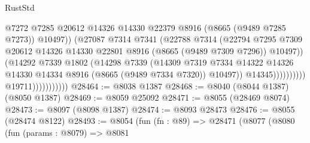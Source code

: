 \begin{lexlean}{RustStd}
\begin{coremodule}
                                              @7272
                                              @7285
                                              @20612
                                              @14326
                                              @14330
                                              @22379
                                              @8916
                                              (@8665 (@9489 @7285 @7273))
                                              @10497))
                                          (@27087
                                            @7314
                                            @7341
                                            (@22788
                                              @7314
                                              (@22794
                                                @7295
                                                @7309
                                                @20612
                                                @14326
                                                @14330
                                                @22801
                                                @8916
                                                (@8665 (@9489 @7309 @7296))
                                                @10497))
                                            (@14292
                                              @7339
                                              @1802
                                              (@14298
                                                @7339
                                                (@14309
                                                  @7319
                                                  @7334
                                                  @14322
                                                  @14326
                                                  @14330
                                                  @14334
                                                  @8916
                                                  (@8665 (@9489 @7334 @7320))
                                                  @10497))
                                              @14345))))))))))
                          @19711)))))))))))
@28464 := @8038 @1387
@28468 := @8040 (@8044 @1387) (@8050 @1387)
@28469 := @8059 @25092
@28471 := @8055 (@28469 @8074)
@28473 := @8097 (@8098 @1387)
@28474 := @8093 @28473
@28476 := @8055 (@28474 @8122)
@28493 := @8054
    (fun (fn : @89) =>
    @28471
      (@8077
        (@8080
          (fun (params : @8079) =>
          @8081

\end{coremodule}
\end{lexlean}
